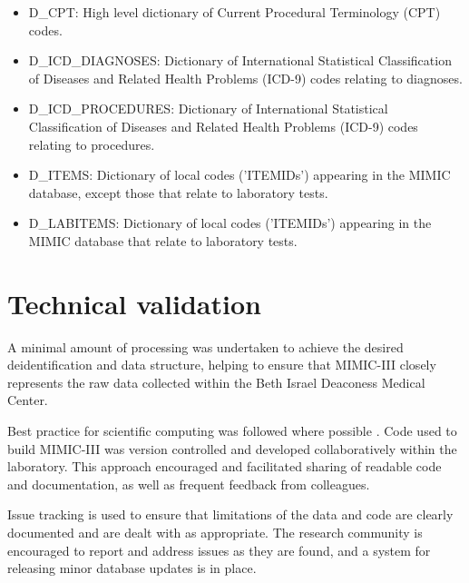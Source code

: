 \documentclass[english]{article}
\begin{document}
\begin{itemize}
  \item D\_CPT: High level dictionary of Current Procedural Terminology (CPT) codes.
  \item D\_ICD\_DIAGNOSES: Dictionary of International Statistical Classification of Diseases and Related Health Problems (ICD-9) codes relating to diagnoses.
  \item D\_ICD\_PROCEDURES: Dictionary of International Statistical Classification of Diseases and Related Health Problems (ICD-9) codes relating to procedures.
  \item D\_ITEMS: Dictionary of local codes ('ITEMIDs') appearing in the MIMIC database, except those that relate to laboratory tests.
  \item D\_LABITEMS: Dictionary of local codes ('ITEMIDs') appearing in the MIMIC database that relate to laboratory tests.
\end{itemize}


\section*{Technical validation}


A minimal amount of processing was undertaken to achieve the desired deidentification and data structure, helping to ensure that MIMIC-III closely represents the raw data collected within the Beth Israel Deaconess Medical Center.

Best practice for scientific computing was followed where possible \cite{cite4}. Code used to build MIMIC-III was version controlled and developed collaboratively within the laboratory. This approach encouraged and facilitated sharing of readable code and documentation, as well as frequent feedback from colleagues.

Issue tracking is used to ensure that limitations of the data and code are clearly documented and are dealt with as appropriate. The research community is encouraged to report and address issues as they are found, and a system for releasing minor database updates is in place.
\end{document}
